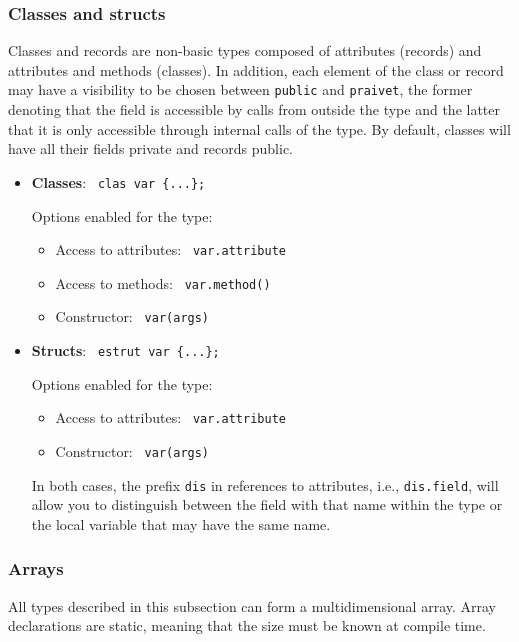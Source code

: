 \documentclass[10pt,a4paper]{article}
\begin{document}
\subsubsection{Classes and structs}
Classes and records are non-basic types composed of attributes (records) and attributes and methods (classes). In addition, each element of the class or record may have a visibility to be chosen between \texttt{\color{blue}public} and \texttt{\color{blue}praivet}, the former denoting that the field is accessible by calls from outside the type and the latter that it is only accessible through internal calls of the type. By default, classes will have all their fields private and records public.

\begin{itemize}
    \item \textbf{Classes}: \texttt{\color{blue} clas var \{...\};}
    
    Options enabled for the type:
    \begin{itemize}
        \item Access to attributes: \texttt{\color{blue} var.attribute}
        \item Access to methods: \texttt{\color{blue} var.method()}
        \item Constructor: \texttt{\color{blue} var(args)}
    \end{itemize}
    \item \textbf{Structs}: \texttt{\color{blue} estrut var \{...\};}
    
    Options enabled for the type:
    \begin{itemize}
        \item Access to attributes: \texttt{\color{blue} var.attribute}
        \item Constructor: \texttt{\color{blue} var(args)}
    \end{itemize}

    In both cases, the prefix \texttt{\color{blue}dis} in references to attributes, i.e., \texttt{\color{blue}dis.field}, will allow you to distinguish between the field with that name within the type or the local variable that may have the same name.
\end{itemize}

\subsubsection{Arrays}
All types described in this subsection can form a multidimensional array. Array declarations are static, meaning that the size must be known at compile time.
 
\end{document}
